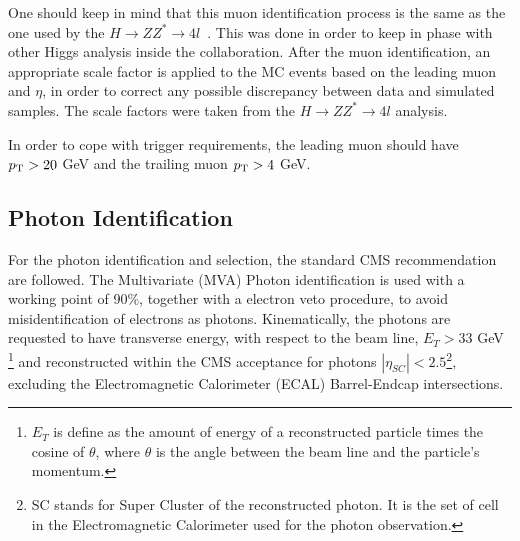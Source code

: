 





One should keep in mind that this muon identification process is the same as the one used by the $H \rightarrow ZZ^{*} \rightarrow 4l$~\cite{higgs_zz_4l_papper}. This was done in order to keep in phase with other Higgs analysis inside the collaboration. After the muon identification, an appropriate scale factor is applied to the MC events based on the leading muon \PT and $\eta$, in order to correct any possible discrepancy between data and simulated samples. The scale factors were taken from the $H \rightarrow ZZ^{*} \rightarrow 4l$ analysis.

In order to cope with trigger requirements, the leading muon should have $p_{\mathrm{T}} > 20$ GeV and the trailing muon $p_{\mathrm{T}} > 4$ GeV.


\subsection{Photon Identification}
\label{sec:photon_id}

For the photon identification and selection, the standard CMS recommendation are followed. The Multivariate (MVA) Photon identification is used with a working point of 90\%, together with a electron veto procedure, to avoid misidentification of electrons as photons. Kinematically, the photons are requested to have transverse energy, with respect to the beam line, $E_{T} > 33$ GeV \footnote{$E_{T}$ is define as the amount of energy of a reconstructed particle times the cosine of $\theta$, where $\theta$ is the angle between the beam line and the particle's momentum.} and reconstructed within the CMS acceptance for photons $|\eta_{SC}| < 2.5$\footnote{SC stands for Super Cluster of the reconstructed photon. It is the set of cell in the Electromagnetic Calorimeter used for the photon observation.}, excluding the Electromagnetic Calorimeter (ECAL) Barrel-Endcap intersections.

